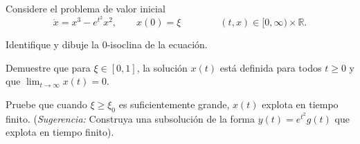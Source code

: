 \begin{problema}
Considere el problema de valor inicial
\[
    \dot{x} = x^3 - e^{t^2} x^2,\qquad x(0) = \xi
    \qquad\qquad (t,x) \in [0,\infty)\times \mathbb{R}
.\]
\begin{plist}
    \item Identifique y dibuje la 0-isoclina de la ecuación.

    \item Demuestre que para \(\xi \in [0,1]\), la solución \(x(t)\) está
    definida para todos \(t \ge 0\) y que \(\lim_{t \to \infty} x(t) = 0\).

    \item Pruebe que cuando \(\xi \ge \xi_0\) es suficientemente grande,
    \(x(t)\) explota en tiempo finito. (\textit{Sugerencia:} Construya una
    subsolución de la forma \(y(t) = e^{t^2} g(t)\) que explota en tiempo
    finito).
\end{plist}
\end{problema}
